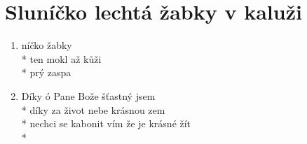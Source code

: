 \section{Sluníčko lechtá žabky v kaluži}
\begin{enumerate}
\item {}níčko  žabky  \\*
 ten mokl až  kůži \\*
  prý   zaspa 
\item Díky ó Pane Bože šťastný jsem \\*
díky za život nebe krásnou zem \\*
nechci se kabonit vím že je krásné žít \\*
\end{enumerate}
